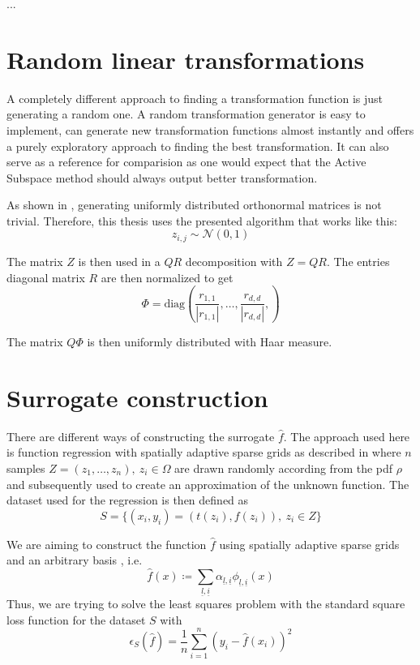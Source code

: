 \documentclass[
  a4paper,  %
  twoside,  %
  bibliography=totoc,
  headsepline,
  cleardoublepage=empty,
  parskip=half,
  draft=false
]{scrbook}
\begin{document}
...

\chapter{Random linear transformations}

A completely different approach to finding a transformation function is just generating a random one.
A random transformation generator is easy to implement, can generate new transformation functions almost instantly and offers a purely exploratory approach to finding the best transformation.
It can also serve as a reference for comparision as one would expect that the Active Subspace method should always output better transformation.

As shown in \cite{ABC}, generating uniformly distributed orthonormal matrices is not trivial.
Therefore, this thesis uses the presented algorithm that works like this:
\begin{equation}
z_{i,j} \sim \mathcal{N}\left(0, 1\right)
\end{equation}

The matrix $Z$ is then used in a $QR$ decomposition with $Z=QR$.
The entries diagonal matrix $R$ are then normalized to get
\begin{equation}
\Phi=\text{diag}(\frac{r_{1,1}}{|r_{1,1}|}, \dots, \frac{r_{d,d}}{|r_{d,d}|},)
\end{equation}

The matrix $Q \Phi$ is then uniformly distributed with Haar measure.





\chapter{Surrogate construction}

There are different ways of constructing the surrogate $\hat{f}$.
The approach used here is function regression with spatially adaptive sparse grids as described in \cite{P10} where $n$ samples $Z=(z_1,\dots,z_n), ~ z_i \in \Omega$ are drawn randomly according from the pdf $\rho$ and subsequently used to create an approximation of the unknown function.
The dataset used for the regression is then defined as
\begin{equation}
S=\{(x_i,y_i) = (t(z_i),f(z_i)), ~ z_i \in Z\}
\end{equation}

We are aiming to construct the function $\hat{f}$ using spatially adaptive sparse grids and an arbitrary basis , i.e.
\begin{equation}
\hat{f}(x) \coloneqq \sum_{\underline{l},\underline{i}} \alpha_{\underline{l},\underline{i}} \phi_{\underline{l},\underline{i}}(x)
\end{equation}
Thus, we are trying to solve the least squares problem with the standard square loss function for the dataset $S$ with
\begin{equation}
\epsilon_{S}(\hat{f})=\frac{1}{n} \sum_{i=1}^n (y_i - \hat{f}(x_i))^2 
\end{equation}
\end{document}
